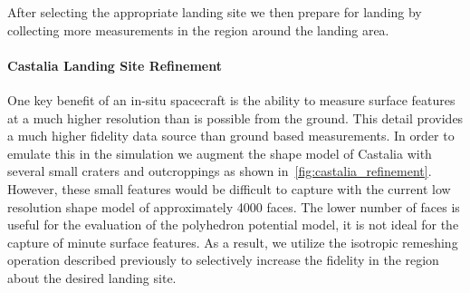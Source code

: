 \documentclass[journal]{new-aiaa}
\begin{document}
After selecting the appropriate landing site we then prepare for landing by collecting more measurements in the region around the landing area.


\paragraph{Castalia Landing Site Refinement}


One key benefit of an in-situ spacecraft is the ability to measure surface features at a much higher resolution than is possible from the ground. 
This detail provides a much higher fidelity data source than ground based measurements. 
In order to emulate this in the simulation we augment the shape model of Castalia with several small craters and outcroppings as shown in~\cref{fig:castalia_refinement}.
However, these small features would be difficult to capture with the current low resolution shape model of approximately \num{4000} faces.
The lower number of faces is useful for the evaluation of the polyhedron potential model, it is not ideal for the capture of minute surface features. 
As a result, we utilize the isotropic remeshing operation described previously to selectively increase the fidelity in the region about the desired landing site.
\end{document}
